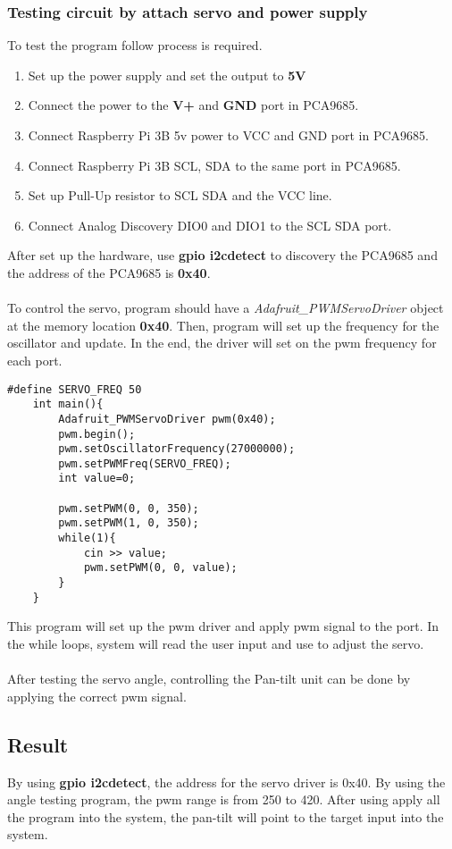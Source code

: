 \documentclass{article}
\begin{document}
\subsubsection{Testing circuit by attach servo and power supply}
To test the program follow process is required.
\begin{enumerate}[1)]
	\item Set up the power supply and set the output to \textbf{5V}
	\item Connect the power to the \textbf{V+} and \textbf{GND} port in PCA9685.
	\item Connect Raspberry Pi 3B 5v power to VCC and GND port in PCA9685.
	\item Connect Raspberry Pi 3B SCL, SDA to the same port in PCA9685.
	\item Set up Pull-Up resistor to SCL SDA and the VCC line.
	\item Connect Analog Discovery DIO0 and DIO1 to the SCL SDA port.
\end{enumerate}
After set up the hardware, use \textbf{gpio i2cdetect} to discovery the PCA9685 and the address of the PCA9685 is \textbf{0x40}.\\\\
To control the servo, program should have a \textit{Adafruit\_PWMServoDriver} object at the memory location \textbf{0x40}. Then, program will set up the frequency for the oscillator and update. In the end, the driver will set on the pwm frequency for each port.
\begin{lstlisting}
#define SERVO_FREQ 50
	int main(){
		Adafruit_PWMServoDriver pwm(0x40);
		pwm.begin();
		pwm.setOscillatorFrequency(27000000);
		pwm.setPWMFreq(SERVO_FREQ);
		int value=0;
		
		pwm.setPWM(0, 0, 350);
		pwm.setPWM(1, 0, 350);
		while(1){
			cin >> value;
			pwm.setPWM(0, 0, value);
		}
	}
\end{lstlisting}
This program will set up the pwm driver and apply pwm signal to the port. In the while loops, system will read the user input and use to adjust the servo.
\\\\
After testing the servo angle, controlling the Pan-tilt unit can be done by applying the correct pwm signal.
\subsection{Result}
By using \textbf{gpio i2cdetect}, the address for the servo driver is 0x40.
By using the angle testing program, the pwm range is from 250 to 420.
After using apply all the program into the system, the pan-tilt will point to the target input into the system.
\clearpage
\end{document}
